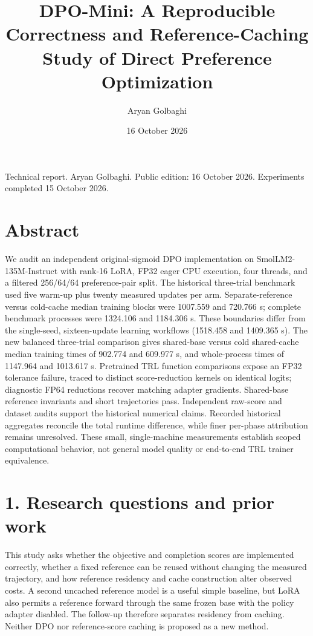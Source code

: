 \documentclass[10pt]{article}
\title{DPO-Mini: A Reproducible Correctness and Reference-Caching Study of Direct Preference Optimization}
\author{Aryan Golbaghi}
\date{16 October 2026}
\begin{document}
\maketitle

Technical report. Aryan Golbaghi. Public edition: 16 October 2026. Experiments completed 15 October 2026.


\section*{Abstract}

We audit an independent original-sigmoid DPO implementation on SmolLM2-135M-Instruct with rank-16 LoRA, FP32 eager CPU execution, four threads, and a filtered 256/64/64 preference-pair split. The historical three-trial benchmark used five warm-up plus twenty measured updates per arm. Separate-reference versus cold-cache median training blocks were 1007.559 and 720.766 s; complete benchmark processes were 1324.106 and 1184.306 s. These boundaries differ from the single-seed, sixteen-update learning workflows (1518.458 and 1409.365 s). The new balanced three-trial comparison gives shared-base versus cold shared-cache median training times of 902.774 and 609.977 s, and whole-process times of 1147.964 and 1013.617 s. Pretrained TRL function comparisons expose an FP32 tolerance failure, traced to distinct score-reduction kernels on identical logits; diagnostic FP64 reductions recover matching adapter gradients. Shared-base reference invariants and short trajectories pass. Independent raw-score and dataset audits support the historical numerical claims. Recorded historical aggregates reconcile the total runtime difference, while finer per-phase attribution remains unresolved. These small, single-machine measurements establish scoped computational behavior, not general model quality or end-to-end TRL trainer equivalence.


\section*{1. Research questions and prior work}

This study asks whether the objective and completion scores are implemented correctly, whether a fixed reference can be reused without changing the measured trajectory, and how reference residency and cache construction alter observed costs. A second uncached reference model is a useful simple baseline, but LoRA also permits a reference forward through the same frozen base with the policy adapter disabled. The follow-up therefore separates residency from caching. Neither DPO nor reference-score caching is proposed as a new method.
\end{document}
